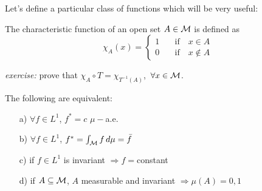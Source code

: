 Let's define a particular class of functions which will be very useful:
\begin{definition}
    The characteristic function of an open set $A \in \mathcal{M}$ is defined as 
    \begin{equation}
    \chi_A (x) = 
        \begin{cases}
            1 \quad & \text{if} \quad x \in A \\
            0 \quad & \text{if} \quad x \notin A
        \end{cases}
    \end{equation}
\end{definition}
\textit{exercise:} prove that $\chi_A \circ T = \chi_{T^{-1}(A)}$, $\, \forall x \in \mathcal{M}$. 
\begin{prop}
    The following are equivalent:
    \begin{itemize}
        \item[a)] $\forall f \in L^1$, $f^*=c$ $\mu-$a.e.
        \item[b)] $\forall f \in L^1$, $f^*= \int_{\mathcal{M}} f \, d\mu = \Bar{f}$
        \item[c)] if $f \in L^1$ is invariant $\Rightarrow f=$constant
        \item[d)] if $A \subseteq \mathcal{M}$, $A$ measurable and invariant $\Rightarrow \mu(A) = 0,1$
    \end{itemize}
\end{prop}
